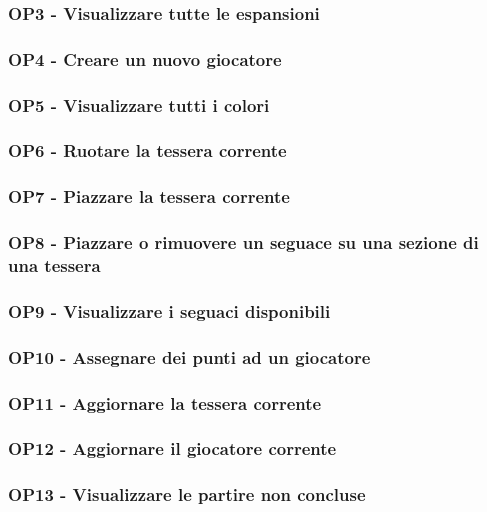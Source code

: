 \subsubsection*{OP3 - Visualizzare tutte le espansioni}

\subsubsection*{OP4 - Creare un nuovo giocatore}

\subsubsection*{OP5 - Visualizzare tutti i colori}

\subsubsection*{OP6 - Ruotare la tessera corrente}

\subsubsection*{OP7 - Piazzare la tessera corrente}

\subsubsection*{OP8 - Piazzare o rimuovere un seguace su una sezione di una tessera}

\subsubsection*{OP9 - Visualizzare i seguaci disponibili}

\subsubsection*{OP10 - Assegnare dei punti ad un giocatore}

\subsubsection*{OP11 - Aggiornare la tessera corrente}

\subsubsection*{OP12 - Aggiornare il giocatore corrente}

\subsubsection*{OP13 - Visualizzare le partire non concluse}

